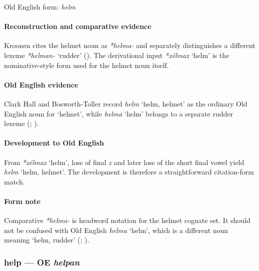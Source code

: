 \documentclass[
  british,
  a4paper,
]{article}
\providecommand{\Recon}[1]{\emph{*#1}}
\begin{document}
Old English form: \emph{helm}

\paragraph{Reconstruction and comparative
evidence}\label{reconstruction-and-comparative-evidence-31}

Kroonen cites the helmet noun as \emph{*helma-} and separately
distinguishes a different lexeme \emph{*helman-} `rudder'
(). The derivational input
\Recon{xélmaz} `helm' is the nominative-style form used for the helmet
noun itself.

\paragraph{Old English evidence}\label{old-english-evidence-31}

Clark Hall and Bosworth-Toller record {\emph{helm}} `helm, helmet' as
the ordinary Old English noun for `helmet', while {\emph{helma}} `helm'
belongs to a separate rudder lexeme (; ).

\paragraph{Development to Old
English}\label{development-to-old-english-31}

From \Recon{xélmaz} `helm', loss of final \emph{z} and later loss of the
short final vowel yield {\emph{helm}} `helm, helmet'. The development is
therefore a straightforward citation-form match.

\paragraph{Form note}\label{form-note-7}

Comparative \emph{*helma-} is headword notation for the helmet cognate
set. It should not be confused with Old English {\emph{helma}} `helm',
which is a different noun meaning `helm, rudder'
(;
).

\subsubsection{\texorpdfstring{help --- OE
\emph{helpan}}{help --- OE helpan}}\label{help-oe-helpan}
\end{document}
